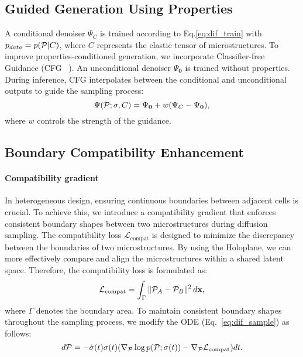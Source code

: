 \subsection{Guided Generation Using Properties}
A conditional denoiser $\Psi_C$ is trained according to Eq.\ref{eq:dif_train} with $p_{data}=p(\mathcal{P} | C)$, where $C$ represents the elastic tensor of microstructures.
To improve properties-conditioned generation, we incorporate Classifier-free Guidance (CFG ~\cite{ho2022classifierfree}). 
An unconditional denoiser $\Psi_{\mathbf{0}}$ is trained without properties.
During inference, CFG interpolates between the conditional and unconditional outputs to guide the sampling process:
\begin{equation}
    \Psi(\mathcal{P};\sigma, C)=\Psi_{\mathbf{0}} + w(\Psi_C - \Psi_{\mathbf{0}}),
\end{equation}
where $w$ controls the strength of the guidance. 


\subsection{Boundary Compatibility Enhancement}
\label{sec:compat}


\paragraph{Compatibility gradient}
In heterogeneous design, ensuring continuous boundaries between adjacent cells is crucial. 
To achieve this, we introduce a compatibility gradient that enforces consistent boundary shapes between two microstructures during diffusion sampling.
The compatibility loss $\mathcal{L}_{\text{compat}}$ is designed to minimize the discrepancy between the boundaries of two microstructures.
By using the Holoplane, we can more effectively compare and align the microstructures within a shared latent space. 
Therefore, the compatibility loss is formulated as:
\begin{equation}
    \mathcal{L}_{\text{compat}} = \int_{\Gamma} \| \mathcal{P}_A - \mathcal{P}_B \|^2 \, d\mathbf{x},
\end{equation}
where $\Gamma$ denotes the boundary area.
To maintain consistent boundary shapes throughout the sampling process, we modify the ODE (Eq.~\ref{eq:dif_sample}) as follows:
\begin{equation}
    d\mathcal{P}=-\dot{\sigma}(t)\sigma(t)(\nabla_{\mathcal{P}}\log{p(\mathcal{P};\sigma(t))} - \nabla_{\mathcal{P}}\mathcal{L}_{\text{compat}})dt.
\end{equation}


